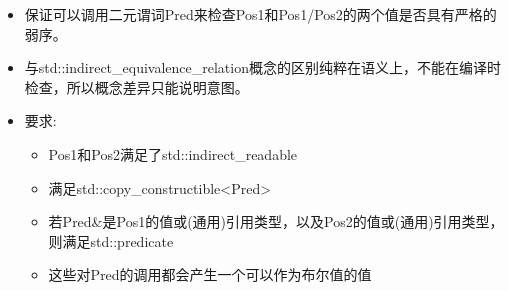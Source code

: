 
\begin{itemize}
\item
保证可以调用二元谓词Pred来检查Pos1和Pos1/Pos2的两个值是否具有严格的弱序。

\item
与std::indirect\_equivalence\_relation概念的区别纯粹在语义上，不能在编译时检查，所以概念差异只能说明意图。

\item
要求:
\begin{itemize}
\item
Pos1和Pos2满足了std::indirect\_readable

\item
满足std::copy\_constructible<Pred>

\item
若Pred\&是Pos1的值或(通用)引用类型，以及Pos2的值或(通用)引用类型，则满足std::predicate

\item
这些对Pred的调用都会产生一个可以作为布尔值的值
\end{itemize}
\end{itemize}










